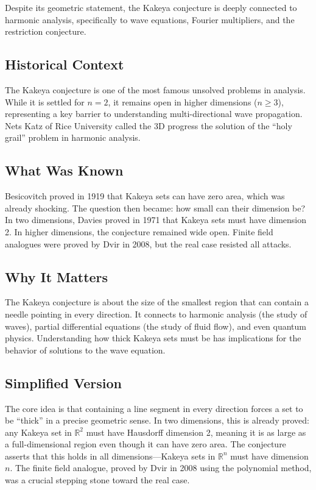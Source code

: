 Despite its geometric statement, the Kakeya conjecture is deeply connected to harmonic analysis, specifically to wave equations, Fourier multipliers, and the restriction conjecture.

\subsection{Historical Context}
The Kakeya conjecture is one of the most famous unsolved problems in analysis. While it is settled for $n=2$, it remains open in higher dimensions ($n \geq 3$), representing a key barrier to understanding multi-directional wave propagation. Nets Katz of Rice University called the 3D progress the solution of the ``holy grail'' problem in harmonic analysis.

\subsection{What Was Known}
Besicovitch proved in 1919 that Kakeya sets can have zero area, which was already shocking. The question then became: how small can their dimension be? In two dimensions, Davies proved in 1971 that Kakeya sets must have dimension 2. In higher dimensions, the conjecture remained wide open. Finite field analogues were proved by Dvir in 2008, but the real case resisted all attacks.

\subsection{Why It Matters}
The Kakeya conjecture is about the size of the smallest region that can contain a needle pointing in every direction. It connects to harmonic analysis (the study of waves), partial differential equations (the study of fluid flow), and even quantum physics. Understanding how thick Kakeya sets must be has implications for the behavior of solutions to the wave equation.

\subsection{Simplified Version}
The core idea is that containing a line segment in every direction forces a set to be ``thick'' in a precise geometric sense. In two dimensions, this is already proved: any Kakeya set in $\mathbb{R}^2$ must have Hausdorff dimension 2, meaning it is as large as a full-dimensional region even though it can have zero area. The conjecture asserts that this holds in all dimensions---Kakeya sets in $\mathbb{R}^n$ must have dimension $n$. The finite field analogue, proved by Dvir in 2008 using the polynomial method, was a crucial stepping stone toward the real case.


